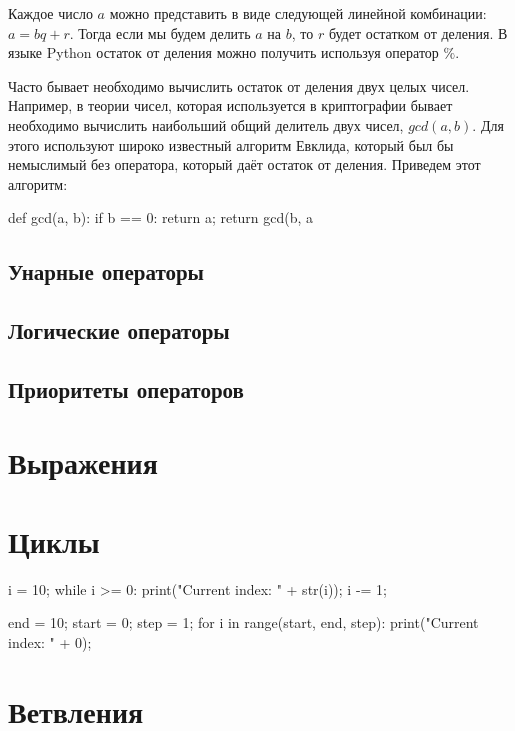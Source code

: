 Каждое число $a$ можно представить в виде следующей линейной комбинации: $a=bq+r$.
Тогда если мы будем делить $a$ на $b$, то $r$ будет остатком от деления. В языке Python
остаток от деления можно получить используя оператор $\%$.

Часто бывает необходимо вычислить остаток от деления двух целых чисел. Например,
в теории чисел, которая используется в криптографии бывает необходимо вычислить 
наибольший общий делитель двух чисел, $gcd(a, b)$. Для этого используют широко известный 
алгоритм Евклида, который был бы немыслимый без оператора, который даёт
остаток от деления. Приведем этот алгоритм:

\begin{python}
def gcd(a, b):
	if b == 0:
		return a;
	return gcd(b, a %
\end{python}

\subsection{Унарные операторы}

\subsection{Логические операторы}

\subsection{Приоритеты операторов}

\section{Выражения}

\section{Циклы}

\begin{python}
i = 10;
while i >= 0:
  print("Current index: " + str(i));
  i -= 1;
\end{python}

\begin{python}
end = 10;
start = 0;
step = 1;
for i in range(start, end, step):
  print("Current index: " + 0);
\end{python}

\section{Ветвления}

